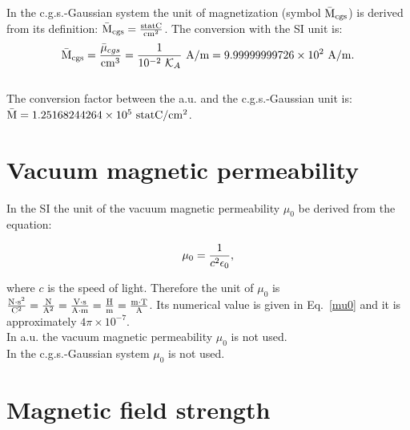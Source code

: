 \documentclass[12pt,a4paper,twoside]{report}
\def\magtomag{9.99999999726\times 10^{2}}
\def\barmagcgs{1.25168244264\times 10^{5}}
\begin{document}
{{\color{orange} In the c.g.s.-Gaussian system the unit of magnetization
(symbol ${\rm \bar M_{cgs}}$) is derived from its definition: 
${\rm \bar M_{cgs}}={{\rm statC} \over {\rm cm}^2}$.
The conversion with the SI unit is:
\begin{equation}
{\rm \bar M_{cgs}} = {\bar \mu_{cgs} \over {\rm cm}^3}={1\over 10^{-2}\ \mathcal{K}_A}\ {\rm A}/{\rm m} =
\magtomag\ {\rm A}/{\rm m}.
\end{equation}
}
\\

{\color{green} The conversion factor between the a.u. and the 
c.g.s.-Gaussian unit is:
${\rm \bar M} = \barmagcgs\ {\rm statC}/{\rm cm}^2$.
}


\newpage
{\color{coral}\section{Vacuum magnetic permeability}}
\color{black}

In the SI the unit of the vacuum magnetic permeability $\mu_0$
be derived from the equation: 

\begin{tcolorbox}
\begin{equation}
\mu_0={1\over c^2 \epsilon_0},
\end{equation}
\end{tcolorbox}

where $c$ is the speed of light. Therefore the unit of $\mu_0$ is 
${{\rm N}\cdot {\rm s}^2 \over {\rm C}^2}={{\rm N} \over {\rm A}^2}={{\rm V}\cdot {\rm s} \over {\rm A} \cdot {\rm m}}=
{{\rm H}\over {\rm m}}={{\rm m}\cdot {\rm T} \over {\rm A}}$. Its numerical
value is given in Eq.~\ref{mu0} and it is approximately $4\pi\times 10^{-7}$.
\\

{\color{web-blue} In a.u. the vacuum magnetic permeability $\mu_0$ is not 
used.}
\\

{\color{orange} In the c.g.s.-Gaussian system $\mu_0$ is not used.
}
\\


\newpage
{\color{coral}\section{Magnetic field strength}}
\color{black}

}
\end{document}
